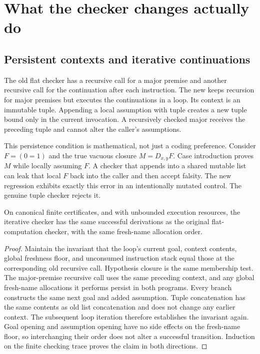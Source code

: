 \section{What the checker changes actually do}
\label{sec:checker-change}

\subsection{Persistent contexts and iterative continuations}

The old flat checker has a recursive call for a major premise and
another recursive call for the continuation after each instruction.
The new  keeps recursion for major premises
but executes the continuations in a  loop. Its context
is an immutable tuple. Appending a local assumption with tuple
\file{+=} creates a new tuple bound only in the current invocation.
A recursively checked major receives the preceding tuple and cannot
alter the caller's assumptions.

This persistence condition is mathematical, not just a coding
preference. Consider $F=(0=1)$ and the true vacuous closure
$M=D_{x,y}F$. Case introduction proves $M$ while locally assuming
$F$. A checker that appends into a shared mutable list can leak
that local $F$ back into the caller and then accept falsity.
The new regression 
exhibits exactly this error in an intentionally mutated control.
The genuine tuple checker rejects it.

\begin{lemma}
On canonical finite certificates, and with unbounded execution
resources, the iterative checker has the same successful derivations
as the original flat-computation checker, with the same fresh-name
allocation order.
\end{lemma}
\begin{proof}
Maintain the invariant that the loop's current goal, context contents,
global freshness floor, and unconsumed instruction stack equal those
at the corresponding old recursive call. Hypothesis closure is the
same membership test. The major-premise recursive call uses the
same preceding context, and any global fresh-name allocations it
performs persist in both programs. Every branch constructs the same
next goal and added assumption. Tuple concatenation has the same
contents as old list concatenation and does not change any earlier
context. The subsequent loop iteration therefore establishes the
invariant again. Goal opening and assumption opening have no
side effects on the fresh-name floor, so interchanging their order
does not alter a successful transition. Induction on the finite
checking trace proves the claim in both directions.
\end{proof}

